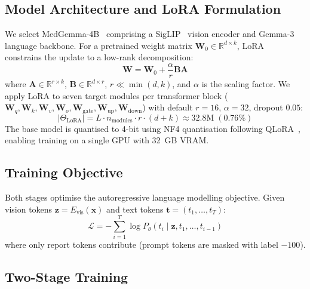 \documentclass{wlscirep}
\begin{document}
\subsection*{Model Architecture and LoRA Formulation}

We select MedGemma-4B~\cite{lin2024medgemma} comprising a SigLIP~\cite{zoph2020siglip} vision encoder and Gemma-3 language backbone. For a pretrained weight matrix $\mathbf{W}_0 \in \mathbb{R}^{d \times k}$, LoRA~\cite{hu2022lora} constrains the update to a low-rank decomposition:
\begin{equation}
\mathbf{W} = \mathbf{W}_0 + \frac{\alpha}{r}\mathbf{B}\mathbf{A}
\label{eq:lora}
\end{equation}
where $\mathbf{A} \in \mathbb{R}^{r \times k}$, $\mathbf{B} \in \mathbb{R}^{d \times r}$, $r \ll \min(d,k)$, and $\alpha$ is the scaling factor. We apply LoRA to seven target modules per transformer block ($\mathbf{W}_q, \mathbf{W}_k, \mathbf{W}_v, \mathbf{W}_o, \mathbf{W}_{\text{gate}}, \mathbf{W}_{\text{up}}, \mathbf{W}_{\text{down}}$) with default $r=16$, $\alpha=32$, dropout $0.05$:
\begin{equation}
|\Theta_{\text{LoRA}}| = L \cdot n_{\text{modules}} \cdot r \cdot (d + k) \approx 32.8\text{M} \;(0.76\%)
\end{equation}
The base model is quantised to 4-bit using NF4 quantisation following QLoRA~\cite{dettmers2024qlora, dettmers2022gptint8}, enabling training on a single GPU with 32~GB VRAM.

\subsection*{Training Objective}

Both stages optimise the autoregressive language modelling objective. Given vision tokens $\mathbf{z} = E_{\text{vis}}(\mathbf{x})$ and text tokens $\mathbf{t} = (t_1, \ldots, t_T)$:
\begin{equation}
\mathcal{L} = -\sum_{i=1}^{T} \log P_\theta(t_i \mid \mathbf{z}, t_1, \ldots, t_{i-1})
\label{eq:loss}
\end{equation}
where only report tokens contribute (prompt tokens are masked with label $-100$).

\subsection*{Two-Stage Training}
\end{document}
